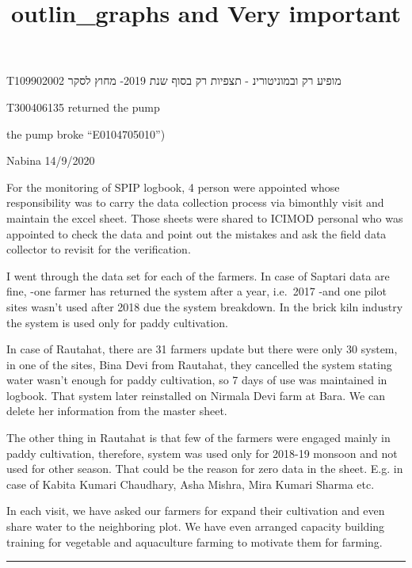 \documentclass[
]{article}
\title{outlin\_graphs and Very important}
\author{}
\date{\vspace{-2.5em}}
\begin{document}
\maketitle

T109902002 מופיע רק ובמוניטורינ - תצפיות רק בסוף שנת 2019- מחוץ לסקר

T300406135 returned the pump

the pump broke ``E0104705010'')

Nabina 14/9/2020

For the monitoring of SPIP logbook, 4 person were appointed whose
responsibility was to carry the data collection process via bimonthly
visit and maintain the excel sheet. Those sheets were shared to ICIMOD
personal who was appointed to check the data and point out the mistakes
and ask the field data collector to revisit for the verification.

I went through the data set for each of the farmers. In case of Saptari
data are fine, -one farmer has returned the system after a year,
i.e.~2017 -and one pilot sites wasn't used after 2018 due the system
breakdown. In the brick kiln industry the system is used only for paddy
cultivation.

In case of Rautahat, there are 31 farmers update but there were only 30
system, in one of the sites, Bina Devi from Rautahat, they cancelled the
system stating water wasn't enough for paddy cultivation, so 7 days of
use was maintained in logbook. That system later reinstalled on Nirmala
Devi farm at Bara. We can delete her information from the master sheet.

The other thing in Rautahat is that few of the farmers were engaged
mainly in paddy cultivation, therefore, system was used only for 2018-19
monsoon and not used for other season. That could be the reason for zero
data in the sheet. E.g. in case of Kabita Kumari Chaudhary, Asha Mishra,
Mira Kumari Sharma etc.

In each visit, we have asked our farmers for expand their cultivation
and even share water to the neighboring plot. We have even arranged
capacity building training for vegetable and aquaculture farming to
motivate them for farming.

\begin{center}\rule{0.5\linewidth}{0.5pt}\end{center}
\end{document}
